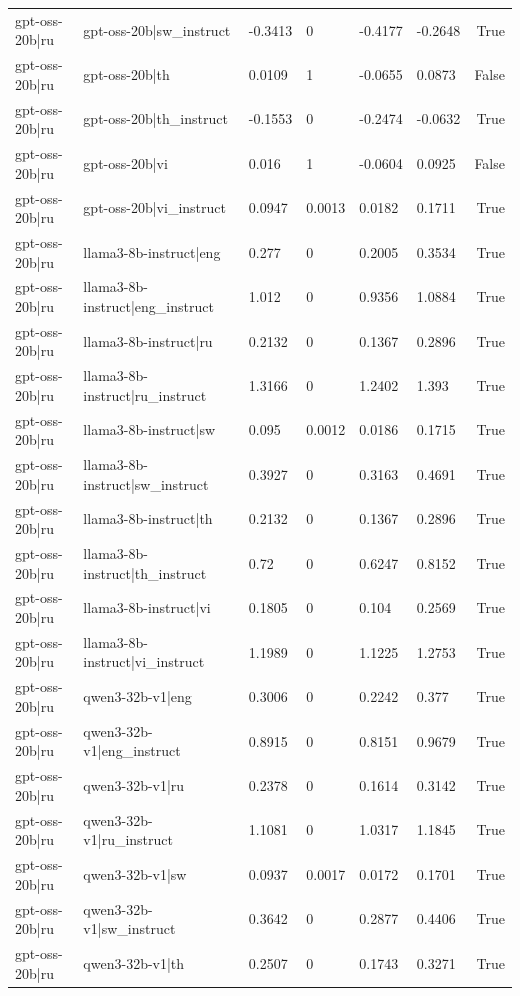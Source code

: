 \begin{table}
\begin{tabular}{llllllr}
gpt-oss-20b|ru & gpt-oss-20b|sw_instruct & -0.3413 & 0 & -0.4177 & -0.2648 & True \\
gpt-oss-20b|ru & gpt-oss-20b|th & 0.0109 & 1 & -0.0655 & 0.0873 & False \\
gpt-oss-20b|ru & gpt-oss-20b|th_instruct & -0.1553 & 0 & -0.2474 & -0.0632 & True \\
gpt-oss-20b|ru & gpt-oss-20b|vi & 0.016 & 1 & -0.0604 & 0.0925 & False \\
gpt-oss-20b|ru & gpt-oss-20b|vi_instruct & 0.0947 & 0.0013 & 0.0182 & 0.1711 & True \\
gpt-oss-20b|ru & llama3-8b-instruct|eng & 0.277 & 0 & 0.2005 & 0.3534 & True \\
gpt-oss-20b|ru & llama3-8b-instruct|eng_instruct & 1.012 & 0 & 0.9356 & 1.0884 & True \\
gpt-oss-20b|ru & llama3-8b-instruct|ru & 0.2132 & 0 & 0.1367 & 0.2896 & True \\
gpt-oss-20b|ru & llama3-8b-instruct|ru_instruct & 1.3166 & 0 & 1.2402 & 1.393 & True \\
gpt-oss-20b|ru & llama3-8b-instruct|sw & 0.095 & 0.0012 & 0.0186 & 0.1715 & True \\
gpt-oss-20b|ru & llama3-8b-instruct|sw_instruct & 0.3927 & 0 & 0.3163 & 0.4691 & True \\
gpt-oss-20b|ru & llama3-8b-instruct|th & 0.2132 & 0 & 0.1367 & 0.2896 & True \\
gpt-oss-20b|ru & llama3-8b-instruct|th_instruct & 0.72 & 0 & 0.6247 & 0.8152 & True \\
gpt-oss-20b|ru & llama3-8b-instruct|vi & 0.1805 & 0 & 0.104 & 0.2569 & True \\
gpt-oss-20b|ru & llama3-8b-instruct|vi_instruct & 1.1989 & 0 & 1.1225 & 1.2753 & True \\
gpt-oss-20b|ru & qwen3-32b-v1|eng & 0.3006 & 0 & 0.2242 & 0.377 & True \\
gpt-oss-20b|ru & qwen3-32b-v1|eng_instruct & 0.8915 & 0 & 0.8151 & 0.9679 & True \\
gpt-oss-20b|ru & qwen3-32b-v1|ru & 0.2378 & 0 & 0.1614 & 0.3142 & True \\
gpt-oss-20b|ru & qwen3-32b-v1|ru_instruct & 1.1081 & 0 & 1.0317 & 1.1845 & True \\
gpt-oss-20b|ru & qwen3-32b-v1|sw & 0.0937 & 0.0017 & 0.0172 & 0.1701 & True \\
gpt-oss-20b|ru & qwen3-32b-v1|sw_instruct & 0.3642 & 0 & 0.2877 & 0.4406 & True \\
gpt-oss-20b|ru & qwen3-32b-v1|th & 0.2507 & 0 & 0.1743 & 0.3271 & True \\

\end{tabular}
\end{table}
